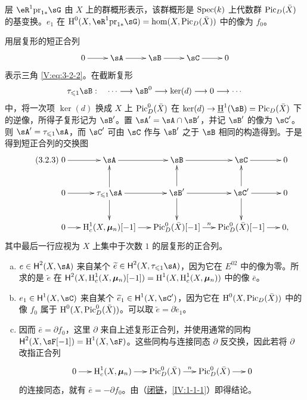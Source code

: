 层 $\eR^1\pr_{1*}\sG$ 由 $X$ 上的群概形表示，该群概形是 $\operatorname{Spec}(k)$ 上代数群 $\operatorname{Pic}_D(\bar X)$ 的基变换。$e_1$ 在
$\h^0(X,\eR^1\pr_{1*}\sG)=\hom(X,\pic_D(\bar X))$ 中的像为 $f_0$。

用层复形的短正合列
\[\xymatrix{0\ar[r]&\sA\ar[r]&\sB\ar[r]&\sC\ar[r]&0}\]
表示三角 \eqref{V:eq:3-2-2}。在截断复形
\[
\tau_{\leqslant1}\sB:\quad\cdots\longrightarrow\sB^0\longrightarrow\ker(d)\longrightarrow0\longrightarrow\cdots
\]
中，将一次项 $\ker(d)$ 换成 $X$ 上 $\operatorname{Pic}_D^0(\bar X)$ 在
$\ker(d)\to\underline\h^1(\sB)=\pic_D(\bar X)$ 下的逆像，所得子复形记为 $\sB'$。置 $\sA'=\sA\cap\sB'$，并记 $\sB'$ 的像为 $\sC'$。则 $\sA'=\tau_{\leqslant1}\sA$，而 $\sC'$ 可由 $\sC$ 作与 $\sB'$ 之于 $\sB$ 相同的构造得到。于是得到短正合列的交换图
\begin{equation*}\tag{3.2.3}\label{V:eq:3-2-3}
\xymatrix@C=15pt{
0\ar[r]&\sA\ar[r]&\sB\ar[r]&\sC\ar[r]&0\\
0\ar[r]&\tau_{\leqslant1}\sA\ar[r]\ar[u]\ar[d]&\sB'\ar[r]\ar[u]\ar[d]&\sC'\ar[r]\ar[u]\ar[d]&0\\
0\ar[r]&\h_c^1(X,\dmu_n)[-1]\ar[r]&\pic_D^0(\bar X)[-1]\ar[r]^-n&\pic_D^0(\bar X)[-1]\ar[r]&0,
}
\end{equation*}
其中最后一行应视为 $X$ 上集中于次数 $1$ 的层复形的正合列。
\begin{enumerate}[a)]
\item $e\in\hh^2(X,\sA)$ 来自某个 $\widetilde e\in\hh^2(X,\tau_{\leqslant1}\sA)$，因为它在 $E^{02}$ 中的像为零。所求的是 $\widetilde e$ 在
$\operatorname{\mathsf{H}}^2(X,\operatorname{H}_c^1(X,{\bm\mu}_n)[-1])=\operatorname{H}^1(X,\operatorname{H}_c^1(X,{\bm\mu}_n))$ 中的像 $\bar e$。
\item $e_1\in\hh^1(X,\sC)$ 来自某个 $\widetilde e_1\in\hh^1(X,\sC')$，因为它在 $\operatorname{H}^0(X,\operatorname{Pic}_D(\bar X))$ 中的像 $f_0$ 属于 $\operatorname{H}^0(X,\operatorname{Pic}_D^0(\bar X))$。可以取 $\widetilde e=\partial\widetilde e_1$。
\item 因而 $\bar e=\partial f_0$，这里 $\partial$ 来自上述复形正合列，并使用通常的同构 $\hh^2(X,\sF[-1])=\h^1(X,\sF)$。这些同构与连接同态 $\partial$ 反交换，因此若将 $\partial$ 改指正合列
\[\xymatrix@C=15pt{0\ar[r]&\h_c^1(X,\dmu_n)\ar[r]&\pic_D^0(\bar X)\ar[r]^-n&\pic_D^0(\bar X)\ar[r]&0}\]
的连接同态，就有 $\bar e=-\partial f_0$。由（\hyperref[IV]{闭链}，\ref{IV:1-1-1}）即得结论。
\end{enumerate}

